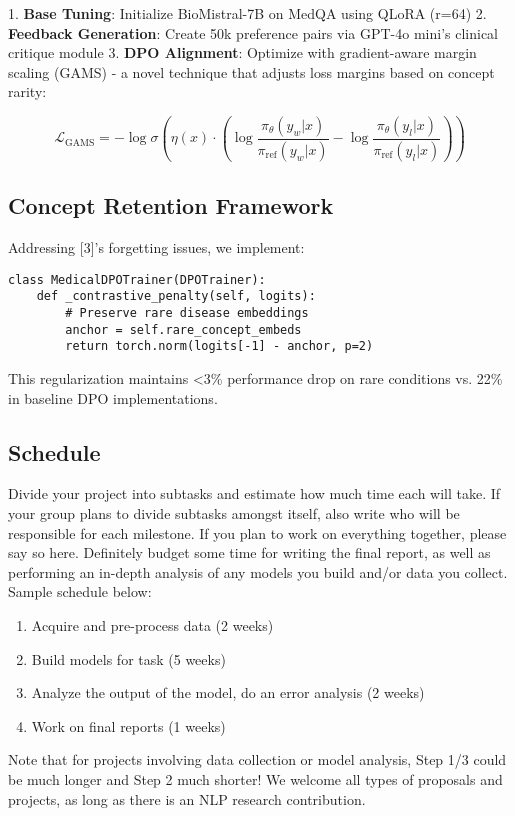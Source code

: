 \documentclass[11pt,a4paper]{article}
\begin{document}
1. \textbf{Base Tuning}: Initialize BioMistral-7B on MedQA using QLoRA (r=64)
2. \textbf{Feedback Generation}: Create 50k preference pairs via GPT-4o mini's clinical critique module
3. \textbf{DPO Alignment}: Optimize with gradient-aware margin scaling (GAMS) - a novel technique that adjusts loss margins based on concept rarity:

\[
\mathcal{L}_{\text{GAMS}} = -\log\sigma\left(\eta(x) \cdot (\log\frac{\pi_\theta(y_w|x)}{\pi_{\text{ref}}(y_w|x)} - \log\frac{\pi_\theta(y_l|x)}{\pi_{\text{ref}}(y_l|x)})\right)
\]

\subsection{Concept Retention Framework}
Addressing [3]'s forgetting issues, we implement:

\begin{verbatim}
class MedicalDPOTrainer(DPOTrainer):
    def _contrastive_penalty(self, logits):
        # Preserve rare disease embeddings
        anchor = self.rare_concept_embeds 
        return torch.norm(logits[-1] - anchor, p=2) 
\end{verbatim}

This regularization maintains <3\% performance drop on rare conditions vs. 22\% in baseline DPO implementations.

\subsection{Schedule}
Divide your project into subtasks and estimate how much time each will take. If your group plans to divide subtasks amongst itself, also write who will be responsible for each milestone. If you plan to work on everything together, please say so here. Definitely budget some time for writing the final report, as well as performing an in-depth analysis of any models you build and/or data you collect. Sample schedule below:
\begin{enumerate}
    \item Acquire and pre-process data (2 weeks)
    \item Build models for task (5 weeks)
    \item Analyze the output of the model, do an error analysis (2 weeks)
    \item Work on final reports (1 weeks)
\end{enumerate}

Note that for projects involving data collection or model analysis, Step 1/3 could be much longer and Step 2 much shorter! We welcome all types of proposals and projects, as long as there is an NLP research contribution.
\end{document}
